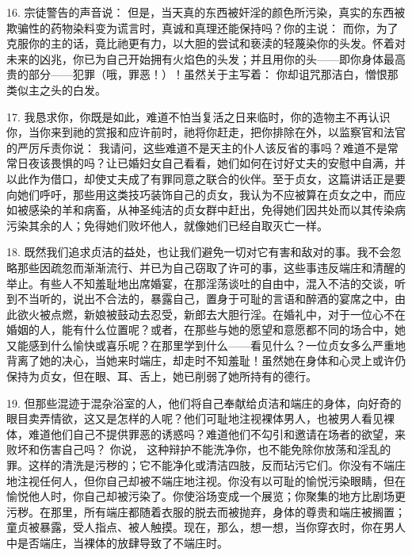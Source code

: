 16. 宗徒警告的声音说： 但是，当天真的东西被奸淫的颜色所污染，真实的东西被欺骗性的药物染料变为谎言时，真诚和真理还能保持吗？你的主说： 而你，为了克服你的主的话，竟比祂更有力，以大胆的尝试和亵渎的轻蔑染你的头发。怀着对未来的凶兆，你已为自己开始拥有火焰色的头发；并且用你的头——即你身体最高贵的部分——犯罪（哦，罪恶！）！虽然关于主写着： 你却诅咒那洁白，憎恨那类似主之头的白发。\par

17. 我恳求你，你既是如此，难道不怕当复活之日来临时，你的造物主不再认识你，当你来到祂的赏报和应许前时，祂将你赶走，把你排除在外，以监察官和法官的严厉斥责你说： 我请问，这些难道不是天主的仆人该反省的事吗？难道不是常常日夜该畏惧的吗？让已婚妇女自己看看，她们如何在讨好丈夫的安慰中自满，并以此作为借口，却使丈夫成了有罪同意之联合的伙伴。至于贞女，这篇讲话正是要向她们呼吁，那些用这类技巧装饰自己的贞女，我认为不应被算在贞女之中，而应如被感染的羊和病畜，从神圣纯洁的贞女群中赶出，免得她们因共处而以其传染病污染其余的人；免得她们败坏他人，就像她们已经自取灭亡一样。\par

18. 既然我们追求贞洁的益处，也让我们避免一切对它有害和敌对的事。我不会忽略那些因疏忽而渐渐流行、并已为自己窃取了许可的事，这些事违反端庄和清醒的举止。有些人不知羞耻地出席婚宴，在那淫荡谈吐的自由中，混入不洁的交谈，听到不当听的，说出不合法的，暴露自己，置身于可耻的言语和醉酒的宴席之中，由此欲火被点燃，新娘被鼓动去忍受，新郎去大胆行淫。在婚礼中，对于一位心不在婚姻的人，能有什么位置呢？或者，在那些与她的愿望和意愿都不同的场合中，她又能感到什么愉快或喜乐呢？在那里学到什么——看见什么？一位贞女多么严重地背离了她的决心，当她来时端庄，却走时不知羞耻！虽然她在身体和心灵上或许仍保持为贞女，但在眼、耳、舌上，她已削弱了她所持有的德行。\par

19. 但那些混迹于混杂浴室的人，他们将自己奉献给贞洁和端庄的身体，向好奇的眼目卖弄情欲，这又是怎样的人呢？他们可耻地注视裸体男人，也被男人看见裸体，难道他们自己不提供罪恶的诱惑吗？难道他们不勾引和邀请在场者的欲望，来败坏和伤害自己吗？ 你说， 这种辩护不能洗净你，也不能免除你放荡和淫乱的罪。这样的清洗是污秽的；它不能净化或清洁四肢，反而玷污它们。你没有不端庄地注视任何人，但你自己却被不端庄地注视。你没有以可耻的愉悦污染眼睛，但在愉悦他人时，你自己却被污染了。你使浴场变成一个展览；你聚集的地方比剧场更污秽。在那里，所有端庄都随着衣服的脱去而被抛弃，身体的尊贵和端庄被搁置；童贞被暴露，受人指点、被人触摸。现在，那么，想一想，当你穿衣时，你在男人中是否端庄，当裸体的放肆导致了不端庄时。\par

